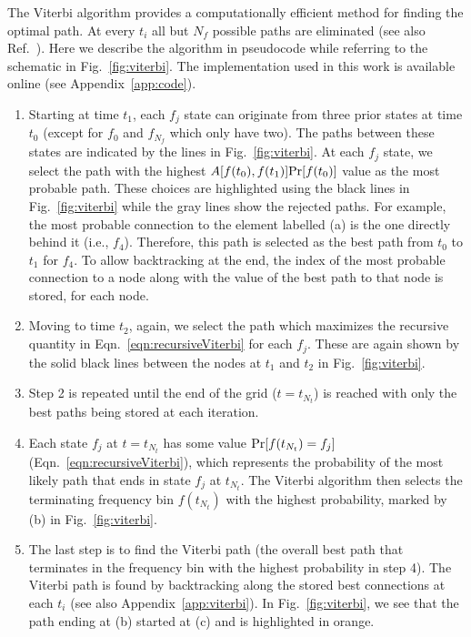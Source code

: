 \documentclass[paper-main.tex]{subfiles}
\begin{document}
The Viterbi algorithm provides a computationally efficient method for finding the optimal path. 
At every $t_i$ all but $N_f$ possible paths are eliminated (see also Ref.~\cite{ScoX1ViterbiO1:2017}). 
Here we describe the algorithm in pseudocode while referring to the schematic in Fig.~\ref{fig:viterbi}.%
The implementation used in this work is available online (see Appendix~\ref{app:code}).
\begin{enumerate}
\item Starting at time $t_1$, each $f_j$ state can originate from three prior states at time $t_0$ (except for $f_0$ and $f_{N_f}$ which only have two). The paths between these states are indicated by the lines in Fig.~\ref{fig:viterbi}. At each $f_j$ state, we select the path with the highest $A[f(t_0),f(t_1)] {\rm Pr}[f(t_0)]$ value as the most probable path. These choices are highlighted using the black lines in Fig.~\ref{fig:viterbi} while the gray lines show the rejected paths. For example, the most probable connection to the element labelled (a) is the one directly behind it (i.e., $f_4$). Therefore, this path is selected as the best path from $t_0$ to $t_1$ for $f_4$. To allow backtracking at the end, the index of the most probable connection to a node along with the value of the best path to that node is stored, for each node.

\item Moving to time $t_2$, again, we select the path which maximizes the recursive quantity in Eqn.~\ref{eqn:recursiveViterbi} for each $f_j$. These are again shown by the solid black lines between the nodes at $t_1$ and $t_2$ in Fig.~\ref{fig:viterbi}.

\item Step 2 is repeated until the end of the grid ($t=t_{N_t}$) is reached with only the best paths being stored at each iteration. 

\item Each state $f_j$ at $t=t_{N_t}$ has some value ${\rm Pr}[f(t_{N_t})=f_j]$ (Eqn.~\ref{eqn:recursiveViterbi}), which represents the probability of the most likely path that ends in state $f_j$ at $t_{N_t}$. The Viterbi algorithm then selects the terminating frequency bin $f(t_{N_t})$ with the highest probability, marked by (b) in Fig.~\ref{fig:viterbi}.

\item The last step is to find the Viterbi path (the overall best path that terminates in the frequency bin with the highest probability in step 4). The Viterbi path is found by backtracking along the stored best connections at each $t_i$ (see also Appendix~\ref{app:viterbi}). In Fig.~\ref{fig:viterbi}, we see that the path ending at (b) started at (c) and is highlighted in orange.
\end{enumerate}
\end{document}
